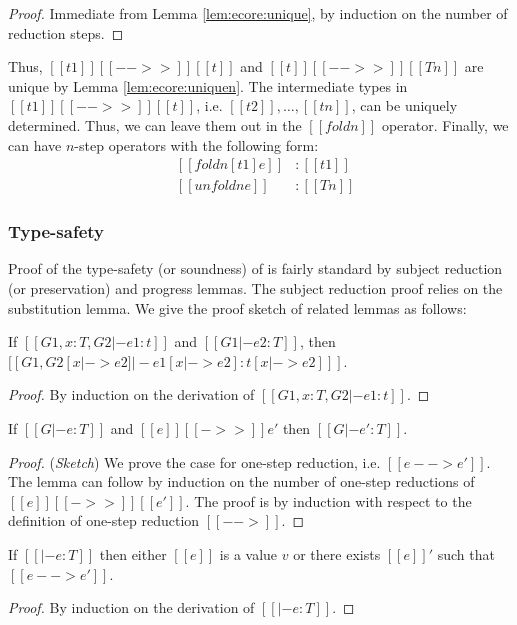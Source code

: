 \begin{proof}
	Immediate from Lemma \ref{lem:ecore:unique}, by induction on the number of reduction steps.
\end{proof}

Thus, $[[t1]] [[-->>]] [[t]]$ and $[[t]] [[-->>]] [[Tn]]$ are unique by Lemma \ref{lem:ecore:uniquen}. The intermediate types in $[[t1]] [[-->>]] [[t]]$, i.e. $[[t2]], \dots, [[tn]]$, can be uniquely determined. Thus, we can leave them out in the $[[foldn]]$ operator. Finally, we can have $n$-step \cast operators with the following form:
\[\begin{array}{lll}
    &[[foldn [t1] e]] & : [[t1]] \\
    &[[unfoldn e]] & : [[Tn]]
\end{array}\]

\subsubsection{Type-safety}
Proof of the type-safety (or soundness) of \ecore is fairly standard by subject reduction (or preservation) and progress lemmas. The subject reduction proof relies on the substitution lemma. We give the proof sketch of related lemmas as follows:

\begin{lem}\label{lem:ecore:subst}
	If $[[G1, x:T, G2 |- e1:t]]$ and $[[G1 |- e2:T]]$, then $[[G1, G2 [x |-> e2] |- e1[x |-> e2]  : t[x |-> e2] ]]$.
\end{lem}

\begin{proof}
    By induction on the derivation of $[[G1, x:T, G2 |- e1:t]]$.
\end{proof}

\begin{lem}\label{lem:ecore:reduct}
If $[[G |- e:T]]$ and $[[e]] [[->>]] e'$ then $[[G |- e':T]]$.
\end{lem}

\begin{proof}
    (\emph{Sketch}) We prove the case for one-step reduction, i.e. $[[e --> e']]$. The lemma can follow by induction on the number of one-step reductions of $[[e]] [[->>]] [[e']]$.
    The proof is by induction with respect to the definition of one-step reduction $[[-->]]$.
\end{proof}

\begin{lem}[Progress]\label{lem:ecore:prog}
If $[[|- e:T]]$ then either $[[e]]$ is a value $v$ or there exists $[[e]]'$ such that $[[e --> e']]$.
\end{lem}

\begin{proof}
    By induction on the derivation of $[[|- e:T]]$.
\end{proof}
